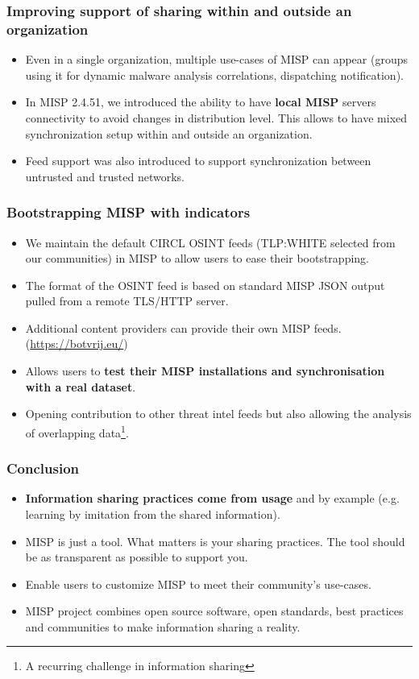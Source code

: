 \begin{frame}
\frametitle{Improving support of sharing within and outside an organization}
\begin{itemize}
        \item Even in a single organization, multiple use-cases of MISP can appear (groups using it for dynamic malware analysis correlations, dispatching notification).
        \item In MISP 2.4.51, we introduced the ability to have {\bf local MISP} servers connectivity to avoid changes in distribution level. This allows to have mixed synchronization setup within and outside an organization.
        \item Feed support was also introduced to support synchronization between untrusted and trusted networks.
\end{itemize}
\end{frame}

\begin{frame}
        \frametitle{Bootstrapping MISP with indicators}
        \begin{itemize}
                \item We maintain the default CIRCL OSINT feeds (TLP:WHITE selected from our communities) in MISP to allow users to ease their bootstrapping.
                \item The format of the OSINT feed is based on standard MISP JSON output pulled from a remote TLS/HTTP server.
                \item Additional content providers can provide their own MISP feeds. (\url{https://botvrij.eu/})
                \item Allows users to {\bf test their MISP installations and synchronisation with a real dataset}.
                \item Opening contribution to other threat intel feeds but also allowing the analysis of overlapping data\footnote{A recurring challenge in information sharing}.
        \end{itemize}
\end{frame}


\begin{frame}
        \frametitle{Conclusion}
        \begin{itemize}
                \item {\bf Information sharing practices come from usage} and by example (e.g. learning by imitation from the shared information).
                \item MISP is just a tool. What matters is your sharing practices. The tool should be as transparent as possible to support you.
                \item Enable users to customize MISP to meet their community's use-cases.
                \item MISP project combines open source software, open standards, best practices and communities to make information sharing a reality.
        \end{itemize}
\end{frame}

